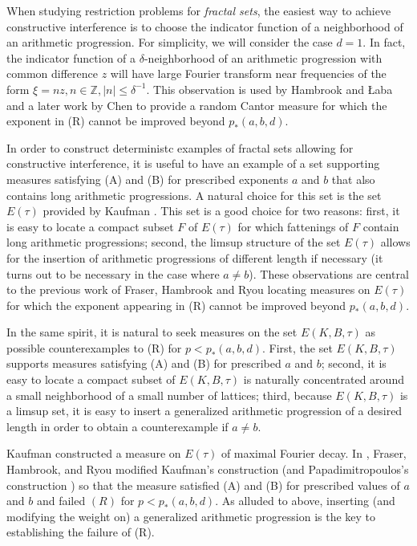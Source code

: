 \documentclass{amsart}
\numberwithin{equation}{section}
\theoremstyle{definition}
\theoremstyle{definition}
\begin{document}
When studying restriction problems for \textit{fractal sets}, the easiest way to achieve constructive interference is to choose the indicator function of a neighborhood of an arithmetic progression. For simplicity, we will consider the case $d = 1$. In fact, the indicator function of a $\delta$-neighborhood of an arithmetic progression with common difference $z$ will have large Fourier transform near frequencies of the form $\xi = n z, n \in \mathbb{Z}, |n| \leq \delta^{-1}$. This observation is used by Hambrook and {\L}aba \cite{HL2013} and a later work by Chen \cite{chen} to provide a random Cantor measure for which the exponent in (R) cannot be improved beyond $p_*(a,b,d)$.

In order to construct deterministc examples of fractal sets allowing for constructive interference, 
it is useful to have an example of a set supporting measures satisfying (A) and (B) for 
prescribed 
exponents $a$ and $b$ that also contains long arithmetic progressions. 
A natural choice for this set is the set $E(\tau)$ provided by Kaufman \cite{Kaufman}. This set is a good choice for two reasons: 
first, it is easy to locate a compact subset $F$ of $E(\tau)$ for which fattenings of $F$ contain long arithmetic progressions; 
second, the limsup structure of the set $E(\tau)$ allows for the insertion of arithmetic progressions of different length if necessary (it turns out to be necessary in the case where $a \neq b$). 
These observations are central to the previous work of Fraser, Hambrook and Ryou \cite{fraser-hambrook-ryou} 
locating measures on $E(\tau)$ for which the exponent appearing in (R) cannot be improved beyond $p_*(a,b,d)$. 

In the same spirit, it is natural to seek measures on the set $E(K,B,\tau)$ as possible counterexamples to (R) for $p < p_*(a,b,d)$. 
First, the set $E(K,B,\tau)$ 
supports measures satisfying (A) and (B) for prescribed  $a$ and $b$; 
second, it is easy to locate a compact subset of $E(K,B,\tau)$ is naturally concentrated around a small neighborhood of a small number of lattices; third, because $E(K,B,\tau)$ is a limsup set, it is easy to insert a generalized arithmetic progression of a desired length in order to obtain a counterexample if $a \neq b$.

Kaufman \cite{Kaufman} constructed a measure on $E(\tau)$ of maximal Fourier decay. In 
\cite{fraser-hambrook-ryou}, Fraser, Hambrook, and Ryou 
modified Kaufman's construction (and Papadimitropoulos's construction \cite{pa-thesis}) so that the measure satisfied (A) and (B) for prescribed values of $a$ and $b$ and failed $(R)$ for $p<p_*(a,b,d)$. As alluded to above, inserting (and modifying the weight on) a generalized arithmetic progression is the key to establishing the failure of (R). 
\end{document}

